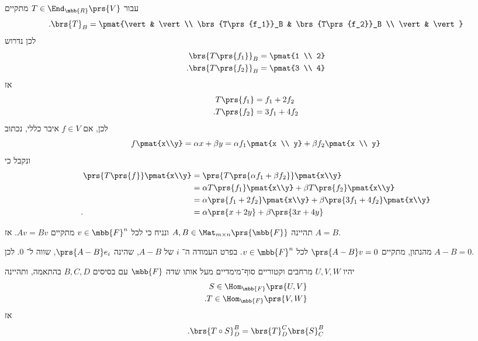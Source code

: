 \documentclass[a4paper,10pt,twoside,openany]{book}
\begin{document}
\begin{solution}
עבור
$T \in \End_{\mbb{R}}\prs{V}$
מתקיים
\[\text{.} \brs{T}_B = \pmat{\vert & \vert \\ \brs{T\prs{f_1}}_B & \brs{T\prs{f_2}}_B \\ \vert & \vert}\]
לכן נדרוש
\begin{align*}
\brs{T\prs{f_1}}_B &= \pmat{1 \\ 2} \\
\text{.} \brs{T\prs{f_2}}_B &= \pmat{3 \\ 4}
\end{align*}
אז
\begin{align*}
T\prs{f_1} &= f_1 + 2 f_2 \\
\text{.} T\prs{f_2} &= 3 f_1 + 4 f_2
\end{align*}
לכן, אם
$f \in V$
איבר כללי, נכתוב
\[f\pmat{x\\y} = \alpha x + \beta y = \alpha f_1 \pmat{x \\ y} + \beta f_2\pmat{x \\ y}\]
ונקבל כי
\begin{align*}
\prs{T\prs{f}}\pmat{x\\y} &= \prs{T\prs{\alpha f_1 + \beta f_2}}\pmat{x\\y}
\\&= \alpha T\prs{f_1}\pmat{x\\y} + \beta T\prs{f_2} \pmat{x\\y}
\\&= \alpha \prs{f_1 + 2 f_2}\pmat{x\\y} + \beta \prs{3 f_1 + 4 f_2} \pmat{x\\y}
\\ \text{.} \hphantom{\prs{T\prs{f}}\pmat{x\\y}} &= \alpha \prs{x + 2 y} + \beta \prs{3 x + 4y}
\end{align*}
\end{solution}

\begin{exercisechap}
תהיינה
$A,B \in \Mat_{m \times n}\prs{\mbb{F}}$
ונניח כי לכל
$v \in \mbb{F}^n$
מתקיים
$Av = Bv$.
אז
$A = B$.
\end{exercisechap}

\begin{solution}
מהנתון, מתקיים
$\prs{A - B}v = 0$
לכל
$v \in \mbb{F}^n$.
בפרט העמודה ה־%
$i$
של
$A-B$,
שהינה
$\prs{A - B}e_i$,
שווה ל־%
$0$.
לכן
$A - B = 0$.
\end{solution}

\begin{proposition}
יהיו
$U,V,W$
מרחבים וקטוריים סוף־מימדיים מעל אותו שדה
$\mbb{F}$
עם בסיסים
$B,C,D$
בהתאמה,
ותהיינה
\begin{align*}
S \in \Hom_{\mbb{F}}\prs{U,V} \\
\text{.} T \in \Hom_{\mbb{F}}\prs{V,W}
\end{align*}
אז
\[\text{.} \brs{T \circ S}^B_D = \brs{T}^C_D \brs{S}^B_C\]
\end{proposition}
\end{document}
